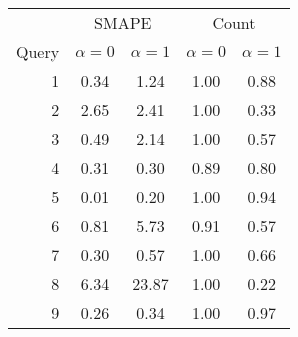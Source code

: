 \begin{tabular}{rcccc}
\toprule
      & \multicolumn{2}{c}{SMAPE}   & \multicolumn{2}{c}{Count} \\
Query & $\alpha = 0$ & $\alpha = 1$ & $\alpha = 0$ & $\alpha = 1$    \\
\midrule
    1 & 0.34         & 1.24         & 1.00         & 0.88            \\
    2 & 2.65         & 2.41         & 1.00         & 0.33            \\
    3 & 0.49         & 2.14         & 1.00         & 0.57            \\
    4 & 0.31         & 0.30         & 0.89         & 0.80            \\
    5 & 0.01         & 0.20         & 1.00         & 0.94            \\
    6 & 0.81         & 5.73         & 0.91         & 0.57            \\
    7 & 0.30         & 0.57         & 1.00         & 0.66            \\
    8 & 6.34         & 23.87        & 1.00         & 0.22            \\
    9 & 0.26         & 0.34         & 1.00         & 0.97            \\
\bottomrule
\end{tabular}
